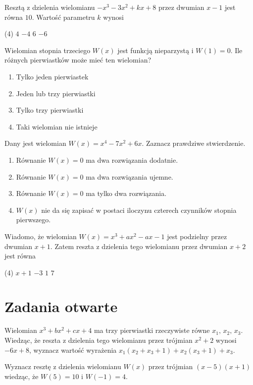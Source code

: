 \zadanie Resztą z dzielenia wielomianu $-x^3 - 3x^2 + kx +8$ przez dwumian $x - 1$ jest równa $10$. Wartość parametru $k$ wynosi
\begin{tasks}(4)
	\task $4$
	\task $-4$
	\task $6$ %
	\task $-6$
\end{tasks}

\zadanie Wielomian stopnia trzeciego $W(x)$ jest funkcją nieparzystą i $W(1) = 0$. Ile różnych pierwiastków może mieć ten wielomian?
\begin{enumerate}[label=\alph*)]
	\item Tylko jeden pierwiastek
	\item Jeden lub trzy pierwiastki
	\item Tylko trzy pierwiastki %
	\item Taki wielomian nie istnieje
\end{enumerate}

\zadanie Dany jest wielomian $W(x) = x^4 - 7x^2 + 6x$. Zaznacz prawdziwe stwierdzenie.
\begin{enumerate}[label=\alph*)]
	\item Równanie $W(x) = 0$ ma dwa rozwiązania dodatnie. %
	\item Równanie $W(x) = 0$ ma dwa rozwiązania ujemne.
	\item Równanie $W(x) = 0$ ma tylko dwa rozwiązania.
	\item $W(x)$ nie da się zapisać w postaci iloczynu czterech czynników stopnia pierwszego.
\end{enumerate}

\zadanie Wiadomo, że wielomian $W(x) = x^3 + ax^2 - ax - 1$ jest podzielny przez dwumian $x + 1$. Zatem reszta z dzielenia tego wielomianu przez dwumian $x + 2$ jest równa
\begin{tasks}(4)
	\task $x + 1$
	\task $-3$ %
	\task $1$
	\task $7$
\end{tasks}

\section{Zadania otwarte}

\zadanie Wielomian $x^3 + bx^2 + cx + 4$ ma trzy pierwiastki rzeczywiste równe $x_1,\, x_2,\, x_3$. Wiedząc, że reszta z dzielenia tego wielomianu przez trójmian $x^2 + 2$ wynosi $-6x + 8$, wyznacz wartość wyrażenia $x_1(x_2 + x_3 + 1) + x_2(x_3 + 1) + x_3$. %

\zadanie Wyznacz resztę z dzielenia wielomianu $W(x)$ przez trójmian $(x - 5)(x + 1)$ wiedząc, że $W(5) = 10$ i $W(-1) = 4$. %

